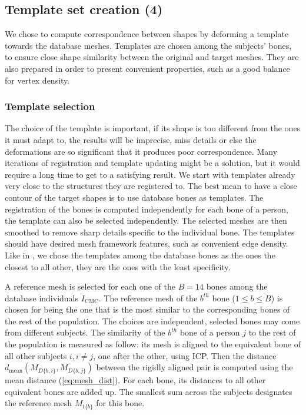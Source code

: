 \subsection{Template set creation (4)}
\label{subsec:3_template_set_creation}

We chose to compute correspondence between shapes by deforming a template towards the database meshes. Templates are chosen among the subjects' bones, to ensure close shape similarity between the original and target meshes. They are also prepared in order to present convenient properties, such as a good balance for vertex density. 


\subsubsection{Template selection}
\label{ssubsec:teplate_selection}

The choice of the template is important, if its shape is too different from the ones it must adapt to, the results will be imprecise, miss details or else the deformations are so significant that it produces poor correspondence. Many iterations of registration and template updating might be a solution, but it would require a long time to get to a satisfying result. We start with templates already very close to the structures they are registered to. The best mean to have a close contour of the target shapes is to use database bones as templates. The registration of the bones is computed independently for each bone of a person, the template can also be selected independently. The selected meshes are then smoothed to remove sharp details specific to the individual bone. The templates should have desired mesh framework features, such as convenient edge density. Like in \cite{joshi_2016_registration-based}, we chose the templates among the database bones as the ones the closest to all other, they are the ones with the least specificity. 


A reference mesh is selected for each one of the $B = 14$ bones among the database individuals $I_\text{CMC}$. The reference mesh of the $b^{th}$ bone ($1 \leq b \leq B$) is chosen for being the one that is the most similar to the corresponding bones of the rest of the population. The choices are independent, selected bones may come from different subjects. The similarity of the $b^{th}$ bone of a person $j$ to the rest of the population is measured as follow: its mesh is aligned to the equivalent bone of all other subjects $i, i\neq j$, one after the other, using ICP.
Then the distance $d_\text{mean}(M_{D\{b,i\}}, M_{D\{b,j\}})$ between the rigidly aligned pair is computed using the mean distance (\ref{eq:mesh_dist}).
For each bone, its distances to all other equivalent bones are added up. The smallest sum across the subjects designates the reference mesh $M_{t \{b\}}$ for this bone.

